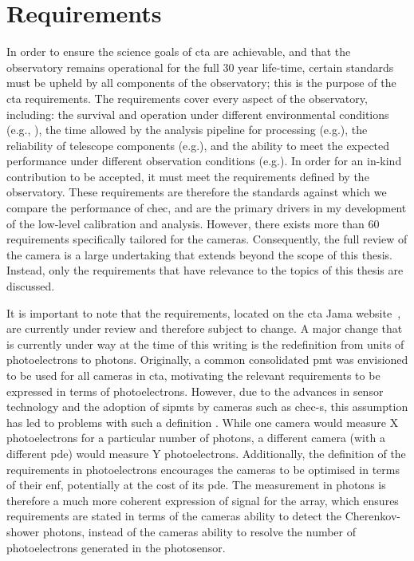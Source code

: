 \section{Requirements}

In order to ensure the science goals of \gls{cta} are achievable, and that the observatory remains operational for the full 30 year life-time, certain standards must be upheld by all components of the observatory; this is the purpose of the \gls{cta} requirements. The requirements cover every aspect of the observatory, including: the survival and operation under different environmental conditions (e.g.\@ {}, ), the time allowed by the analysis pipeline for processing (e.g.\@ {}), the reliability of telescope components (e.g.\@ {}), and the ability to meet the expected performance under different observation conditions (e.g.\@ {}). In order for an in-kind contribution to be accepted, it must meet the requirements defined by the observatory. These requirements are therefore the standards against which we compare the performance of \gls{chec}, and are the primary drivers in my development of the low-level calibration and analysis. However, there exists more than 60 requirements specifically tailored for the cameras. Consequently, the full review of the camera is a large undertaking that extends beyond the scope of this thesis. Instead, only the requirements that have relevance to the topics of this thesis are discussed.

It is important to note that the requirements, located on the \gls{cta} Jama website~\cite{cta-jama}, are currently under review and therefore subject to change. A major change that is currently under way at the time of this writing is the redefinition from units of photoelectrons to photons. Originally, a common consolidated \gls{pmt} was envisioned to be used for all cameras in \gls{cta}, motivating the relevant requirements to be expressed in terms of photoelectrons. However, due to the advances in sensor technology and the adoption of \glspl{sipmt} by cameras such as \gls{chec-s}, this assumption has led to problems with such a definition \cite{petophotons}. While one camera would measure X photoelectrons for a particular number of photons, a different camera (with a different \gls{pde}) would measure Y photoelectrons. Additionally, the definition of the requirements in photoelectrons encourages the cameras to be optimised in terms of their \gls{enf}, potentially at the cost of its \gls{pde}. The measurement in photons is therefore a much more coherent expression of signal for the array, which ensures requirements are stated in terms of the cameras ability to detect the Cherenkov-shower photons, instead of the cameras ability to resolve the number of photoelectrons generated in the photosensor. 

